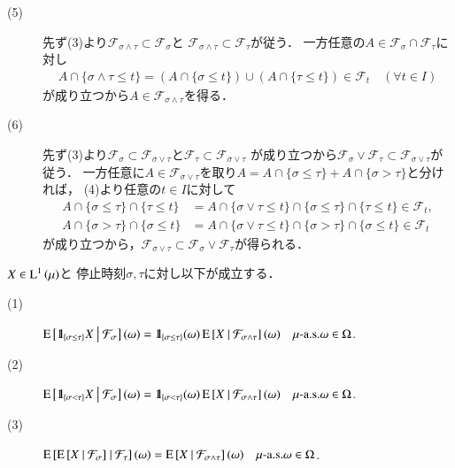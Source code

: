 \begin{prf}
\begin{description}
			\item[(5)] 先ず(3)より$\mathcal{F}_{\sigma \wedge \tau} \subset \mathcal{F}_\sigma$と
				$\mathcal{F}_{\sigma \wedge \tau} \subset \mathcal{F}_\tau$が従う．
				一方任意の$A \in \mathcal{F}_\sigma \cap \mathcal{F}_\tau$に対し
				\begin{align}
					A \cap \{ \sigma \wedge \tau \leq t \} 
					= \left( A \cap \{ \sigma \leq t \} \right) \cup \left( A \cap \{ \tau \leq t \} \right) \in \mathcal{F}_t \quad (\forall t \in I)
				\end{align}
				が成り立つから$A \in \mathcal{F}_{\sigma \wedge \tau}$を得る．
			
			\item[(6)] 
				先ず(3)より$\mathcal{F}_\sigma \subset \mathcal{F}_{\sigma \vee \tau}$と$\mathcal{F}_\tau \subset \mathcal{F}_{\sigma \vee \tau}$
				が成り立つから$\mathcal{F}_\sigma \vee \mathcal{F}_\tau \subset \mathcal{F}_{\sigma \vee \tau}$が従う．
				一方任意に$A \in \mathcal{F}_{\sigma \vee \tau}$を取り$A = A \cap \{ \sigma \leq \tau \} + A \cap \{ \sigma > \tau \}$と分ければ，
				(4)より任意の$t \in I$に対して
				\begin{align}
					A \cap \{ \sigma \leq \tau \} \cap \{ \tau \leq t \}
					&= A \cap \{\sigma \vee \tau \leq t\} \cap \{ \sigma \leq \tau \} \cap \{ \tau \leq t \} \in \mathcal{F}_t, \\
					A \cap \{ \sigma > \tau \} \cap \{ \sigma \leq t \}
					&= A \cap \{\sigma \vee \tau \leq t\} \cap \{ \sigma > \tau \} \cap \{ \sigma \leq t \} \in \mathcal{F}_t
				\end{align}
				が成り立つから，$ \mathcal{F}_{\sigma \vee \tau} \subset \mathcal{F}_\sigma \vee \mathcal{F}_\tau$が得られる．
				\QED
		\end{description}
	\end{prf}
	
	\begin{screen}
		\begin{prp}[停止時刻と条件付き期待値]
			$X \in \operatorname{L}^{1} \left(\operatorname{\mu}\right)$と
			停止時刻$\sigma, \tau$に対し以下が成立する．
			\begin{description}
				\item[(1)] $\operatorname{E} \left[ \mbox{1}\hspace{-0.25em}\mbox{l}_{\{\sigma \leq \tau\}} X \ \middle|\ \mathcal{F}_\sigma \right](\omega) 
					= \mbox{1}\hspace{-0.25em}\mbox{l}_{\{\sigma \leq \tau\}}(\omega) \operatorname{E} \left[ X \ \middle|\ \mathcal{F}_{\sigma \wedge \tau} \right](\omega) 
					\quad \mbox{$\mu$-a.s.}\omega \in \Omega$.
				\item[(2)] $\operatorname{E} \left[ \mbox{1}\hspace{-0.25em}\mbox{l}_{\{\sigma < \tau\}} X \ \middle|\ \mathcal{F}_\sigma \right](\omega) 
					= \mbox{1}\hspace{-0.25em}\mbox{l}_{\{\sigma < \tau\}}(\omega) \operatorname{E} \left[ X \ \middle|\ \mathcal{F}_{\sigma \wedge \tau} \right](\omega) 
					\quad \mbox{$\mu$-a.s.}\omega \in \Omega$.
				\item[(3)] $\operatorname{E} \left[ \operatorname{E} \left[ X \ \middle|\ \mathcal{F}_\sigma \right] \ \middle|\ \mathcal{F}_\tau \right](\omega) = \operatorname{E} \left[ X \ \middle|\ \mathcal{F}_{\sigma \wedge \tau} \right](\omega)
					\quad \mbox{$\mu$-a.s.}\omega \in \Omega$.
			\end{description}
			\label{prp:stopping_time_and_conditional_expectation}
		\end{prp}
	\end{screen}
	
